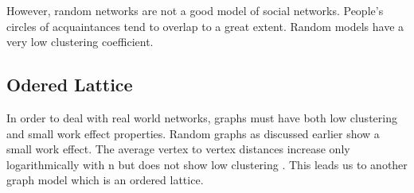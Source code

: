 %
%
%
However,  random  networks  are  not  a  good  model  of  social  networks.  People’s  circles  of  
acquaintances  tend  to  overlap  to  a  great  extent. Random models have a very low clustering coefficient.
\subsection{Odered Lattice}
In order to deal with real world networks, graphs must have both low clustering and small work effect properties.
Random graphs as discussed earlier show a small work effect. The average vertex to vertex distances increase only logarithmically with n but does not show low clustering \citep{newman2000models}. This leads us to another graph model which is an ordered lattice.

